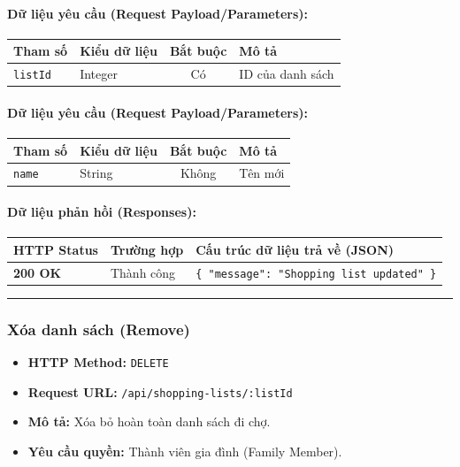 \documentclass[12pt,a4paper]{article}
\begin{document}
\paragraph{Dữ liệu yêu cầu (Request Payload/Parameters):}
\begin{longtable}{|>{\raggedright\arraybackslash}p{2.8cm}|>{\raggedright\arraybackslash}p{2.2cm}|c|>{\raggedright\arraybackslash}p{7.0cm}|}
\hline
\textbf{Tham số} & \textbf{Kiểu dữ liệu} & \textbf{Bắt buộc} & \textbf{Mô tả} \\ \hline
\endhead
\texttt{listId} & Integer & Có & ID của danh sách \\ \hline
\end{longtable}

\paragraph{Dữ liệu yêu cầu (Request Payload/Parameters):}
\begin{longtable}{|>{\raggedright\arraybackslash}p{2.8cm}|>{\raggedright\arraybackslash}p{2.2cm}|c|>{\raggedright\arraybackslash}p{7.0cm}|}
\hline
\textbf{Tham số} & \textbf{Kiểu dữ liệu} & \textbf{Bắt buộc} & \textbf{Mô tả} \\ \hline
\endhead
\texttt{name} & String & Không & Tên mới \\ \hline
\end{longtable}

\paragraph{Dữ liệu phản hồi (Responses):}
\begin{longtable}{|>{\raggedright\arraybackslash}p{2.8cm}|>{\raggedright\arraybackslash}p{3.2cm}|>{\raggedright\arraybackslash}p{8.0cm}|}
\hline
\textbf{HTTP Status} & \textbf{Trường hợp} & \textbf{Cấu trúc dữ liệu trả về (JSON)} \\ \hline
\endhead
\textbf{200 OK} & Thành công & \texttt{\{ "message": "Shopping list updated" \}} \\ \hline
\end{longtable}

\vskip 0.4cm
\noindent\rule{\textwidth}{0.3pt}
\vskip 0.4cm

\subsubsection{Xóa danh sách (Remove)}
\begin{itemize}[leftmargin=*]
    \item \textbf{HTTP Method:} \texttt{DELETE}
    \item \textbf{Request URL:} \texttt{/api/shopping-lists/:listId}
    \item \textbf{Mô tả:} Xóa bỏ hoàn toàn danh sách đi chợ.
    \item \textbf{Yêu cầu quyền:} Thành viên gia đình (Family Member).
\end{itemize}
\end{document}
